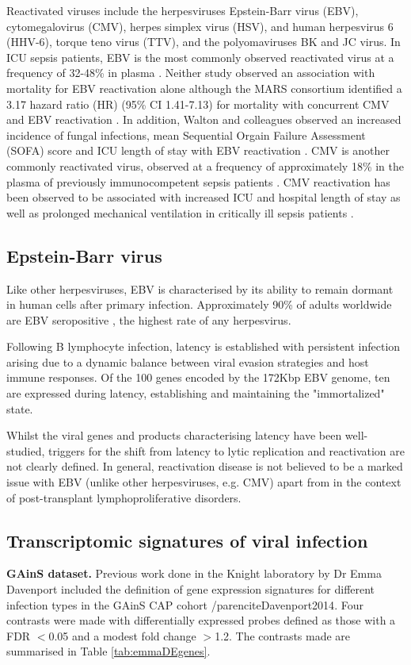 Reactivated viruses include the herpesviruses Epstein-Barr virus (EBV), cytomegalovirus (CMV), herpes simplex virus (HSV), and human herpesvirus 6 (HHV-6), torque teno virus (TTV), and the polyomaviruses BK and JC virus. In ICU sepsis patients, EBV is the most commonly observed reactivated virus at a frequency of 32-48\% in plasma \parencite{Walton2014} \parencite{Ong2017}. Neither study observed an association with mortality for EBV reactivation alone although the MARS consortium identified a 3.17 hazard ratio (HR) (95\% CI 1.41-7.13) for mortality with concurrent CMV and EBV reactivation \parencite{Ong2017}. In addition, Walton and colleagues observed an increased incidence of fungal infections, mean Sequential Orgain Failure Assessment (SOFA) score and ICU length of stay with EBV reactivation \parencite{Walton2014}. CMV is another commonly reactivated virus, observed at a frequency of approximately 18\% in the plasma of previously immunocompetent sepsis patients \parencite{Ong2017}. CMV reactivation has been observed to be associated with increased ICU and hospital length of stay as well as prolonged mechanical ventilation in critically ill sepsis patients \parencite{Heininger2011}.

\subsection{Epstein-Barr virus}
Like other herpesviruses, EBV is characterised by its ability to remain dormant in human cells after primary infection. Approximately 90\% of adults worldwide are EBV seropositive \parencite{Cohen2000}, the highest rate of any herpesvirus. 

Following B lymphocyte infection, latency is established with persistent infection arising due to a dynamic balance between viral evasion strategies and host immune responses. Of the 100 genes encoded by the 172Kbp EBV genome, ten are expressed during latency, establishing and maintaining the "immortalized" state. 

Whilst the viral genes and products characterising latency have been well-studied, triggers for the shift from latency to lytic replication and reactivation are not clearly defined. In general, reactivation disease is not believed to be a marked issue with EBV (unlike other herpesviruses, e.g. CMV) apart from in the context of post-transplant lymphoproliferative disorders.

\subsection{Transcriptomic signatures of viral infection}
\label{sssec:emmaDEgenes}
\textbf{GAinS dataset.} Previous work done in the Knight laboratory by Dr Emma Davenport included the definition of gene expression signatures for different infection types in the GAinS CAP cohort /parencite{Davenport2014}. Four contrasts were made with differentially expressed probes defined as those with a FDR $<$0.05 and a modest fold change $>$1.2. The contrasts made are summarised in Table \ref{tab:emmaDEgenes}. 

